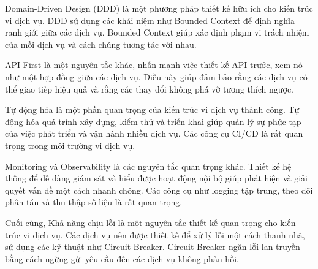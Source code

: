 Domain-Driven Design (DDD) là một phương pháp thiết kế hữu ích cho kiến trúc
vi dịch vụ. DDD sử dụng các khái niệm như Bounded Context để định nghĩa ranh
giới giữa các dịch vụ. Bounded Context giúp xác định phạm vi trách nhiệm của
mỗi dịch vụ và cách chúng tương tác với nhau.

API First là một nguyên tắc khác, nhấn mạnh việc thiết kế API trước, xem nó như
một hợp đồng giữa các dịch vụ. Điều này giúp đảm bảo rằng các dịch vụ có thể
giao tiếp hiệu quả và rằng các thay đổi không phá vỡ tương thích ngược.

Tự động hóa là một phần quan trọng của kiến trúc vi dịch vụ thành công. Tự
động hóa quá trình xây dựng, kiểm thử và triển khai giúp quản lý sự phức tạp
của việc phát triển và vận hành nhiều dịch vụ. Các công cụ CI/CD là rất quan trọng trong môi trường
vi dịch vụ.

Monitoring và Observability là các nguyên tắc quan trọng khác. Thiết kế hệ
thống để dễ dàng giám sát và hiểu được hoạt động nội bộ giúp phát hiện và giải
quyết vấn đề một cách nhanh chóng. Các công cụ như logging tập trung, theo dõi
phân tán và thu thập số liệu là rất quan trọng.

Cuối cùng, Khả năng chịu lỗi là một nguyên tắc thiết kế quan
trọng cho kiến trúc vi dịch vụ. Các dịch vụ nên được thiết kế để xử lý lỗi
một cách thanh nhã, sử dụng các kỹ thuật như Circuit Breaker. Circuit Breaker
ngăn lỗi lan truyền bằng cách ngừng gửi yêu cầu đến các dịch vụ không phản hồi.